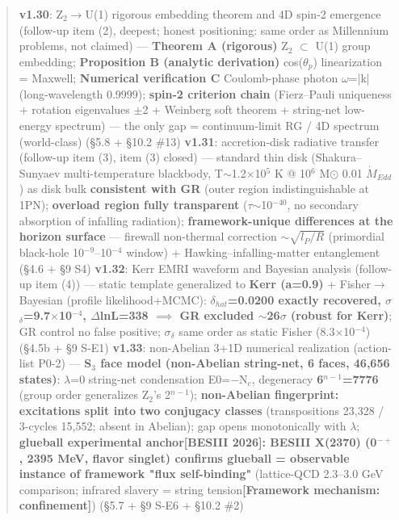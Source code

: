 \documentclass[12pt]{article}
\newcommand{\mtag}[1]{\textbf{[#1]}}
\newcommand{\up}[1]{\ensuremath{^{#1}}}
\newcommand{\down}[1]{\ensuremath{_{#1}}}
\begin{document}
\begin{quote}
\textbf{v1.30}: Z\down{2}\ensuremath{\to}U(1) rigorous embedding theorem and 4D spin-2 emergence (follow-up item (2), deepest; honest positioning: same order as Millennium problems, not claimed) --- \textbf{Theorem A (rigorous)} Z\down{2} \ensuremath{\subset} U(1) group embedding; \textbf{Proposition B (analytic derivation)} cos(\ensuremath{\theta}\down{p}) linearization = Maxwell; \textbf{Numerical verification C} Coulomb-phase photon \ensuremath{\omega}=|k| (long-wavelength 0.9999); \textbf{spin-2 criterion chain} (Fierz--Pauli uniqueness + rotation eigenvalues \ensuremath{\pm}2 + Weinberg soft theorem + string-net low-energy spectrum) --- the only gap = continuum-limit RG / 4D spectrum (world-class) (\S{}5.8 + \S{}10.2 \#13)
\textbf{v1.31}: accretion-disk radiative transfer (follow-up item (3), item (3) closed) --- standard thin disk (Shakura--Sunyaev multi-temperature blackbody, T\ensuremath{\sim}1.2\ensuremath{\times}10\up{5} K @ 10\up{6} M\ensuremath{\odot} 0.01 \ensuremath{\dot{M}}\down{Edd}) as disk bulk \textbf{consistent with GR} (outer region indistinguishable at 1PN); \textbf{overload region fully transparent} (\ensuremath{\tau}\ensuremath{\sim}10\up{-40}, no secondary absorption of infalling radiation); \textbf{framework-unique differences at the horizon surface} --- firewall non-thermal correction \ensuremath{\sim}\ensuremath{\sqrt{l\down{P}/R}} (primordial black-hole 10\up{-9}--10\up{-4} window) + Hawking--infalling-matter entanglement (\S{}4.6 + \S{}9 S4)
\textbf{v1.32}: Kerr EMRI waveform and Bayesian analysis (follow-up item (4)) --- static template generalized to \textbf{Kerr (a=0.9)} + Fisher\ensuremath{\to}Bayesian (profile likelihood+MCMC): \textbf{\ensuremath{\delta}\down{hat}=0.0200 exactly recovered, \ensuremath{\sigma}\down{\delta{}}=9.7\ensuremath{\times}10\up{-4}, \ensuremath{\Delta}lnL=338 \ensuremath{\implies} GR excluded \ensuremath{\sim}26\ensuremath{\sigma} (robust for Kerr)}; GR control no false positive; \ensuremath{\sigma}\down{\delta{}} same order as static Fisher (8.3\ensuremath{\times}10\up{-4}) (\S{}4.5b + \S{}9 S-E1)
\textbf{v1.33}: non-Abelian 3+1D numerical realization (action-list P0-2) --- \textbf{S\down{3} face model (non-Abelian string-net, 6 faces, 46,656 states)}: \ensuremath{\lambda}=0 string-net condensation E0=\ensuremath{-}N\down{c}, degeneracy \textbf{6\up{n-1}=7776} (group order generalizes Z\down{2}'s 2\up{n-1}); \textbf{non-Abelian fingerprint: excitations split into two conjugacy classes} (transpositions 23,328 / 3-cycles 15,552; absent in Abelian); gap opens monotonically with \ensuremath{\lambda}; \textbf{glueball experimental anchor[BESIII 2026]: BESIII X(2370) (0\up{-+}, 2395 MeV, flavor singlet) confirms glueball = observable instance of framework "flux self-binding"} (lattice-QCD 2.3--3.0 GeV comparison; infrared slavery = string tension\mtag{Framework mechanism: confinement}) (\S{}5.7 + \S{}9 S-E6 + \S{}10.2 \#2)
\end{quote}
\end{document}
